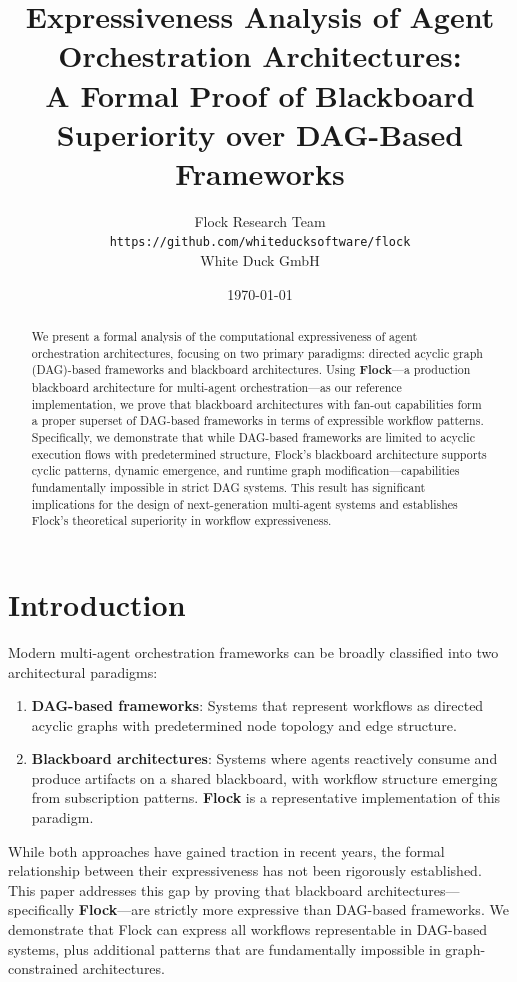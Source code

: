 \documentclass[11pt]{article}
\title{Expressiveness Analysis of Agent Orchestration Architectures:\\
A Formal Proof of Blackboard Superiority over DAG-Based Frameworks}
\author{Flock Research Team\\
\texttt{https://github.com/whiteducksoftware/flock}\\
White Duck GmbH}
\date{\today}
\begin{document}
\maketitle

\begin{abstract}
We present a formal analysis of the computational expressiveness of agent orchestration architectures, focusing on two primary paradigms: directed acyclic graph (DAG)-based frameworks and blackboard architectures. Using \textbf{Flock}---a production blackboard architecture for multi-agent orchestration---as our reference implementation, we prove that blackboard architectures with fan-out capabilities form a proper superset of DAG-based frameworks in terms of expressible workflow patterns. Specifically, we demonstrate that while DAG-based frameworks are limited to acyclic execution flows with predetermined structure, Flock's blackboard architecture supports cyclic patterns, dynamic emergence, and runtime graph modification---capabilities fundamentally impossible in strict DAG systems. This result has significant implications for the design of next-generation multi-agent systems and establishes Flock's theoretical superiority in workflow expressiveness.
\end{abstract}

\section{Introduction}

Modern multi-agent orchestration frameworks can be broadly classified into two architectural paradigms:

\begin{enumerate}
    \item \textbf{DAG-based frameworks}: Systems that represent workflows as directed acyclic graphs with predetermined node topology and edge structure.
    \item \textbf{Blackboard architectures}: Systems where agents reactively consume and produce artifacts on a shared blackboard, with workflow structure emerging from subscription patterns. \textbf{Flock} is a representative implementation of this paradigm.
\end{enumerate}

While both approaches have gained traction in recent years, the formal relationship between their expressiveness has not been rigorously established. This paper addresses this gap by proving that blackboard architectures---specifically \textbf{Flock}---are strictly more expressive than DAG-based frameworks. We demonstrate that Flock can express all workflows representable in DAG-based systems, plus additional patterns that are fundamentally impossible in graph-constrained architectures.
\end{document}
